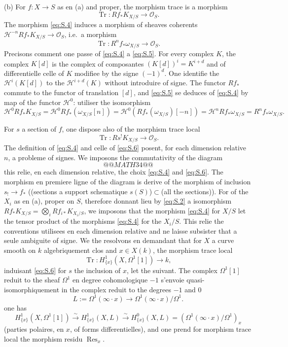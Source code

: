 \documentclass[12pt,a4paper]{article}
\theoremstyle{plain}
\theoremstyle{definition}
\theoremstyle{remark}
\DeclareMathOperator{\Res}{Res}
\DeclareMathOperator{\Tr}{Tr}
\newcommand{\OO}{\mathcal{O}}
\providecommand{\Tr}{\operatorname{Tr}}
\begin{document}
(b) For $f:X\to S$ as en (a) and proper, the morphism trace is a morphism
\begin{equation}\label{eq:S.4}
\Tr:Rf_*K_{X/S}\to\OO_S.
\end{equation}
The morphism \eqref{eq:S.4} induces a morphism of sheaves coherents
$\mathscr{H}^{-n}Rf_*K_{X/S}\to\OO_S$, i.e.\ a morphism
\begin{equation}\label{eq:S.5}
\Tr:R^nf_*\omega_{X/S}\to\OO_S.
\end{equation}
Precisons comment one passe of \eqref{eq:S.4} a \eqref{eq:S.5}. For every complex
$K$, the complex $K[d]$ is the complex of composantes $(K[d])^i=K^{i+d}$ and of
differentielle celle of $K$ modifiee by the signe $(-1)^d$. One identifie the
$\mathscr{H}^i(K[d])$ to the $\mathscr{H}^{i+d}(K)$ without introduire of signe. The functor $Rf_*$
commute to the functor of translation $[d]$, and \eqref{eq:S.5} se deduces of
\eqref{eq:S.4} by map of the functor $\mathscr{H}^0$: utiliser the isomorphism
\[
\mathscr{H}^0 Rf_*K_{X/S}=\mathscr{H}^0 Rf_*(\omega_{X/S}[n])=\mathscr{H}^0(Rf_*(\omega_{X/S})[-n])
=\mathscr{H}^n Rf_*\omega_{X/S}=R^nf_*\omega_{X/S}.
\]

For $s$ a section of $f$, one dispose also of the morphism trace local
\begin{equation}\label{eq:S.6}
\Tr:Rs^!K_{X/S}\to\OO_S.
\end{equation}
The definition of \eqref{eq:S.4} and celle of \eqref{eq:S.6} posent, for each dimension
relative $n$, a probleme of signes. We imposons the commutativity of the diagram
\[
@@MATH34@@
\]
this relie, en each dimension relative, the choix \eqref{eq:S.4} and \eqref{eq:S.6}.
The morphism en premiere ligne of the diagram is derive of the morphism
of inclusion $s_!\to f_*$ ((sections a support schematique $s(S)$)$\subset$(all the
sections)). For of the $X_i$ as en (a), proper on $S$, therefore donnant lieu by
\eqref{eq:S.2} a isomorphism $Rf_*K_{X/S}=\bigotimes_i Rf_{i*}K_{X_i/S}$, we imposons
that the morphism \eqref{eq:S.4} for $X/S$ let the tensor product of the morphisms
\eqref{eq:S.4} for the $X_i/S$. This relie the conventions utilisees en each dimension
relative and ne laisse subsister that a seule ambiguite of signe. We the resolvons en
demandant that for $X$ a curve smooth on $k$ algebriquement clos and $x\in X(k)$,
the morphism trace local
\begin{equation}\label{eq:S.7}
\Tr:H^1_{\{x\}}(X,\Omega^1[1])\to k,
\end{equation}
induisant \eqref{eq:S.6} for $s$ the inclusion of $x$, let the suivant. The complex
$\Omega^1[1]$ reduit to the sheaf $\Omega^1$ en degree cohomologique $-1$ s'envoie quasi-
isomorphiquement in the complex reduit to the degrees $-1$ and $0$
\[
L:=\Omega^1(\infty\cdot x)\to\Omega^1(\infty\cdot x)/\Omega^1.
\]
one has
\[
H^1_{\{x\}}(X,\Omega^1[1])\xrightarrow{\sim} H^1_{\{x\}}(X,L)\xrightarrow{\sim} H^0_{\{x\}}(X,L)=(\Omega^1(\infty\cdot x)/\Omega^1)_x
\]
(parties polaires, en $x$, of forms differentielles), and one prend for morphism
trace local the morphism residu $\Res_x$.
\end{document}
